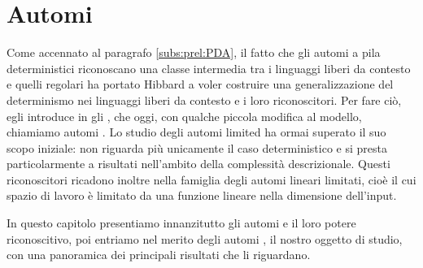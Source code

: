 \chapter{Automi }
Come accennato al paragrafo \ref{subs:prel:PDA}, il fatto che gli automi a pila deterministici riconoscano una classe intermedia tra i linguaggi liberi da contesto e quelli regolari ha portato Hibbard a voler costruire una generalizzazione del determinismo nei linguaggi liberi da contesto e i loro riconoscitori. Per fare ciò, egli introduce in \cite{Hibbard:67:CFdet} gli , che oggi, con qualche piccola modifica al modello, chiamiamo automi . Lo studio degli automi limited ha ormai superato il suo scopo iniziale: non riguarda più unicamente il caso deterministico e si presta particolarmente a risultati nell'ambito della complessità descrizionale. Questi riconoscitori ricadono inoltre nella famiglia degli automi lineari limitati, cioè il cui spazio di lavoro è limitato da una funzione lineare nella dimensione dell'input.

In questo capitolo presentiamo innanzitutto gli automi  e il loro potere riconoscitivo, poi entriamo nel merito degli automi , il nostro oggetto di studio, con una panoramica dei principali risultati che li riguardano.



